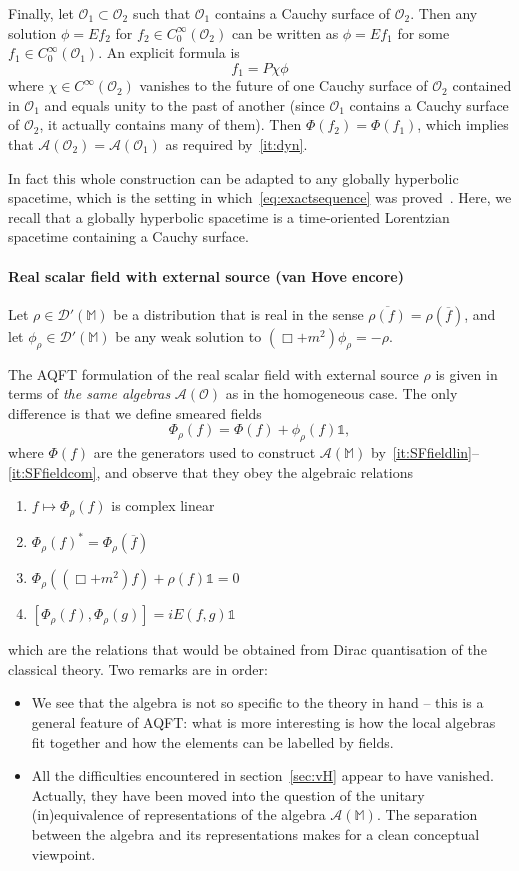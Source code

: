 \documentclass[12pt]{article}
\newcommand{\1}{\mathds{1}}                         %
\newcommand{\Ocal}{\mathcal{O}}
\newcommand{\MM}{\mathbb{M}}
\newcommand{\DD}{{\mathscr{D}}}
\newcommand{\II}{{\mathbb{1}}}
\newcommand{\Ac}{{\mathcal{A}}}
\newcommand{\CoinX}[1]{C_0^\infty(#1)}
\begin{document}
	Finally, let $\Ocal_1\subset \Ocal_2$ such that $\Ocal_1$ contains a Cauchy surface of $\Ocal_2$. Then any solution $\phi=Ef_2$ for $f_2\in\CoinX{\Ocal_2}$ can be written as
	$\phi=Ef_1$ for some $f_1\in\CoinX{\Ocal_1}$. An explicit formula is 
	\[
	f_1 = P \chi \phi
	\]
	where $\chi\in C^\infty(\Ocal_2)$ vanishes to the future of one Cauchy surface of $\Ocal_2$ contained in $\Ocal_1$ and equals unity to the past of another (since $\Ocal_1$ contains a Cauchy surface of $\Ocal_2$, it actually contains many of them).
	Then $\Phi(f_2)=\Phi(f_1)$, which implies that $\Ac(\Ocal_2)=\Ac(\Ocal_1)$ as required by~\ref{it:dyn}. 
	
	In fact this whole construction can be adapted to any globally hyperbolic spacetime, which is the setting in which~\eqref{eq:exactsequence} was proved~\cite{BarGinouxPfaffle}. Here, we recall that a globally hyperbolic spacetime is a time-oriented Lorentzian spacetime containing a Cauchy surface. 
	
	\paragraph{Real scalar field with external source (van Hove encore)} Let $\rho\in\DD'(\MM)$ be a distribution that is real in the sense $\overline{\rho(f)}=\rho(\overline{f})$, and let $\phi_\rho\in\DD'(\MM)$ be any weak solution to $(\Box+m^2)\phi_\rho= -\rho$. 
	
	The AQFT formulation of the real scalar field with external source $\rho$ is given in terms of \emph{the same algebras} $\Ac(\Ocal)$ as in the homogeneous case. The only difference is that we define smeared fields 
	\[
	\Phi_\rho(f) =\Phi(f) +\phi_\rho(f)\II ,
	\]
	where $\Phi(f)$ are the generators used to construct $\Ac(\MM)$ by~\ref{it:SFfieldlin}--\ref{it:SFfieldcom},
	and observe that they obey the algebraic relations 
		\begin{enumerate}[label=\bf vH\arabic{enumi},leftmargin=*,widest=4] 
		\item $f\mapsto \Phi_\rho(f)$ is complex linear 
		\item $\Phi_\rho(f)^*=\Phi_\rho(\overline{f})$ 
		\item $\Phi_\rho((\Box+ m^2)f)+\rho(f)\II=0$ 
		\item $[\Phi_\rho(f),\Phi_\rho(g)] = iE (f,g)\II$ 
	\end{enumerate}
	which are the relations that would be obtained from Dirac quantisation of the classical theory. 
	Two remarks are in order:
	\begin{itemize}
		\item We see that the algebra is not so specific to the theory in hand -- this is a general feature of AQFT: what is more interesting is how the local algebras fit together and how the elements can be labelled by fields.
		\item All the difficulties encountered in section~\ref{sec:vH} appear to have vanished. Actually, they have been moved into the question of the unitary (in)equivalence of
		representations of the algebra $\Ac(\MM)$. The separation between the algebra and its representations makes for a clean conceptual viewpoint. 
	\end{itemize}
	
\end{document}
